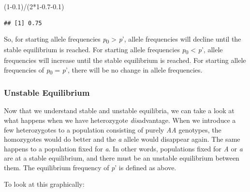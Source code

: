 \documentclass[
]{book}
\newenvironment{Shaded}{\begin{snugshade}}{\end{snugshade}}
\newcommand{\DecValTok}[1]{\textcolor[rgb]{0.00,0.00,0.81}{#1}}
\newcommand{\FloatTok}[1]{\textcolor[rgb]{0.00,0.00,0.81}{#1}}
\newcommand{\NormalTok}[1]{#1}
\newcommand{\SpecialCharTok}[1]{\textcolor[rgb]{0.00,0.00,0.00}{#1}}
\begin{document}
\begin{Shaded}
\begin{Highlighting}[]
\NormalTok{(}\DecValTok{1}\FloatTok{{-}0.1}\NormalTok{)}\SpecialCharTok{/}\NormalTok{(}\DecValTok{2}\SpecialCharTok{*}\DecValTok{1}\FloatTok{{-}0.7{-}0.1}\NormalTok{)}
\end{Highlighting}
\end{Shaded}

\begin{verbatim}
## [1] 0.75
\end{verbatim}

So, for starting allele frequencies \emph{p}\textsubscript{0} \textgreater{} \emph{p}', allele frequencies will decline until the stable equilibrium is reached. For starting allele frequencies \emph{p}\textsubscript{0} \textless{} \emph{p}', allele frequencies will increase until the stable equilibrium is reached. For starting allele frequencies of \emph{p}\textsubscript{0} = \emph{p}', there will be no change in allele frequencies.

\hypertarget{unstable-equilibrium}{%
\subsubsection*{Unstable Equilibrium}\label{unstable-equilibrium}}

Now that we understand stable and unstable equilibria, we can take a look at what happens when we have heterozygote \emph{dis}advantage. When we introduce a few heterozygotes to a population consisting of purely \emph{AA} genotypes, the homozygotes would do better and the \emph{a} allele would disappear again. The same happens to a population fixed for \emph{a}. In other words, populations fixed for \emph{A} or \emph{a} are at a stable equilibrium, and there must be an unstable equilibrium between them. The equilibrium frequency of \emph{p}' is defined as above.

To look at this graphically:
\end{document}
